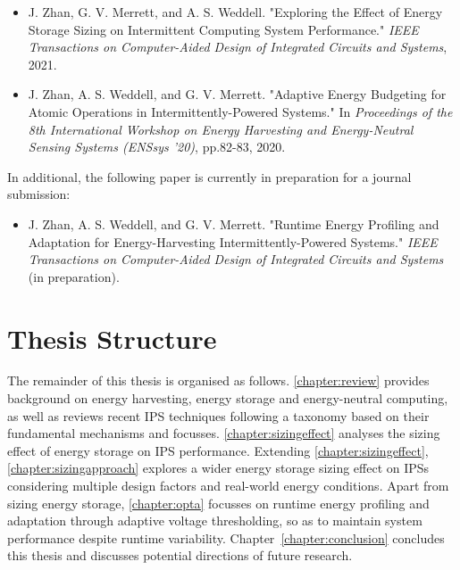 \begin{itemize}
    \item J. Zhan, G. V. Merrett, and A. S. Weddell. "Exploring the Effect of Energy Storage Sizing on Intermittent Computing System Performance." \textit{IEEE Transactions on Computer-Aided Design of Integrated Circuits and Systems}, 2021.~\cite{zhan2021exploring}

    \item J. Zhan, A. S. Weddell, and G. V. Merrett. "Adaptive Energy Budgeting for Atomic Operations in Intermittently-Powered Systems." In \textit{Proceedings of the 8th International Workshop on Energy Harvesting and Energy-Neutral Sensing Systems (ENSsys '20)}, pp.82-83, 2020.~\cite{zhan2020adaptive}
\end{itemize}

In additional, the following paper is currently in preparation for a journal submission:

\begin{itemize}
    \item J. Zhan, A. S. Weddell, and G. V. Merrett. "Runtime Energy Profiling and Adaptation for Energy-Harvesting Intermittently-Powered Systems." \textit{IEEE Transactions on Computer-Aided Design of Integrated Circuits and Systems} (in preparation).
\end{itemize}


\section{Thesis Structure}

The remainder of this thesis is organised as follows. 
\cref{chapter:review} provides background on energy harvesting, energy storage and energy-neutral computing, as well as reviews recent IPS techniques following a taxonomy based on their fundamental mechanisms and focusses.
\cref{chapter:sizingeffect} analyses the sizing effect of energy storage on IPS performance.
Extending \cref{chapter:sizingeffect}, \cref{chapter:sizingapproach} explores a wider energy storage sizing effect on IPSs considering multiple design factors and real-world energy conditions. 
Apart from sizing energy storage, \cref{chapter:opta} focusses on runtime energy profiling and adaptation through adaptive voltage thresholding, so as to maintain system performance despite runtime variability.
Chapter~\ref{chapter:conclusion} concludes this thesis and discusses potential directions of future research. 